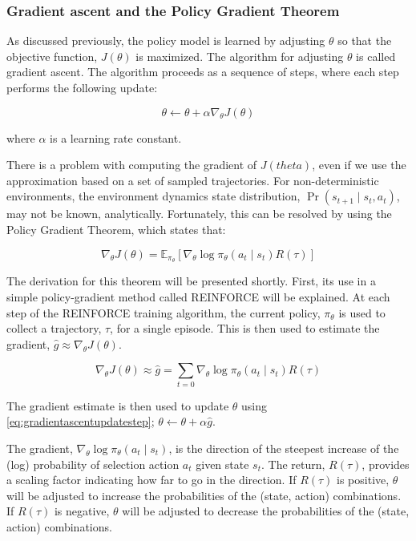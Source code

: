 \documentclass[acmlarge,screen]{acmart}
\begin{document}
\subsubsection{Gradient ascent and the Policy Gradient Theorem}

As discussed previously, the policy model is learned by adjusting $\theta$ so that the objective function, $J(\theta)$ is maximized.
The algorithm for adjusting $\theta$ is called gradient ascent.
The algorithm proceeds as a sequence of steps, where each step performs the following update:

\begin{equation}
  \theta \leftarrow \theta + \alpha \nabla_\theta J(\theta)
\label{eq:gradientascentupdatestep}
\end{equation}

\noindent where $\alpha$ is a learning rate constant.

There is a problem with computing the gradient of $J(theta)$, even if we use the approximation based on a set of sampled trajectories.
For non-deterministic environments, the environment dynamics state distribution, $\Pr(s_{t+1} \mid s_t, a_t)$, may not be known, analytically.
Fortunately, this can be resolved by using the Policy Gradient Theorem, which states that:

\begin{equation}
  \nabla_\theta J (\theta) = \mathbb{E}_{\pi_\theta} \left[ \nabla_\theta \log \pi_\theta (a_t \mid s_t) R(\tau)  \right]
\label{eq:policygradienttheorem1}
\end{equation}

The derivation for this theorem will be presented shortly.
First, its use in a simple policy-gradient method called REINFORCE will be explained.
At each step of the REINFORCE training algorithm, the current policy, $\pi_\theta$ is used to collect a trajectory, $\tau$, for a single episode.
This is then used to estimate the gradient, $\hat{g} \approx \nabla_\theta J (\theta)$.

\begin{equation}
  \nabla_\theta J (\theta) \approx \hat{g} = \sum_{t=0} \nabla_\theta \log \pi_\theta (a_t \mid s_t) R(\tau)
\label{eq:policygradienttheorem1}
\end{equation}

\noindent The gradient estimate is then used to update $\theta$ using \ref{eq:gradientascentupdatestep};  $\theta \leftarrow \theta + \alpha \hat{g}$.

The gradient, $\nabla_\theta \log \pi_\theta (a_t \mid s_t)$, is the direction of the steepest increase of the (log) probability of selection action $a_t$ given state $s_t$.
The return, $R(\tau)$, provides a scaling factor indicating how far to go in the direction.
If $R(\tau)$ is positive, $\theta$ will be adjusted to increase the probabilities of the (state, action) combinations.
If $R(\tau)$ is negative, $\theta$ will be adjusted to decrease the probabilities of the (state, action) combinations.
\end{document}
